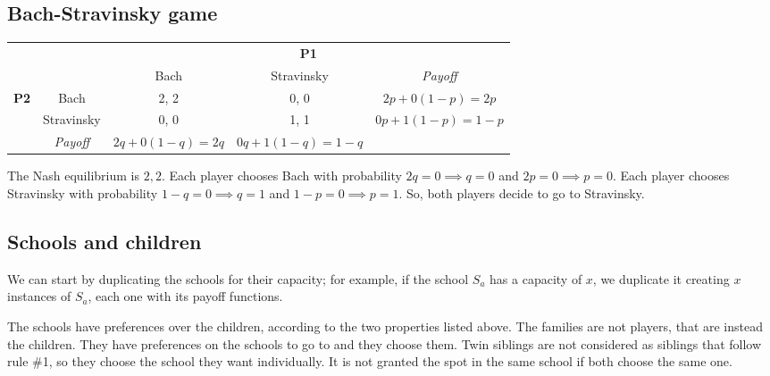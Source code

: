 \documentclass{article}
\begin{document}
\subsection{Bach-Stravinsky game}
\begin{center}
\begin{tabular}{ccccc}
                                                        &                                      & \multicolumn{3}{c}{\textbf{P1}}                                                                             \\ \cline{3-5} 
                                                        & \multicolumn{1}{c|}{}                & \multicolumn{1}{c|}{Bach}           & \multicolumn{1}{c|}{Stravinsky}      & \multicolumn{1}{c|}{\textit{Payoff}} \\ \cline{2-5} 
\multicolumn{1}{c|}{\multirow{3}{*}{\textbf{P2}}} & \multicolumn{1}{c|}{Bach}            & \multicolumn{1}{c|}{2, 2}           & \multicolumn{1}{c|}{0, 0}            & \multicolumn{1}{c|}{$2p+0(1-p)=2p$}  \\ \cline{2-5} 
\multicolumn{1}{c|}{}                                   & \multicolumn{1}{c|}{Stravinsky}      & \multicolumn{1}{c|}{0, 0}           & \multicolumn{1}{c|}{1, 1}            & \multicolumn{1}{c|}{$0p+1(1-p)=1-p$} \\ \cline{2-5} 
\multicolumn{1}{c|}{}                                   & \multicolumn{1}{c|}{\textit{Payoff}} & \multicolumn{1}{c|}{$2q+0(1-q)=2q$} & \multicolumn{1}{c|}{$0q+1(1-q)=1-q$} & \multicolumn{1}{c|}{}                \\ \cline{2-5} 
\end{tabular}
\end{center}
The Nash equilibrium is $2,2$.
Each player chooses Bach with probability $2q=0 \implies q=0$ and $2p=0 \implies p=0$.
Each player chooses Stravinsky with probability $1-q=0 \implies q=1$ and $1-p=0 \implies p=1$.
So, both players decide to go to Stravinsky.

\subsection{Schools and children}
We can start by duplicating the schools for their capacity; for example, if the school $S_a$ has a capacity of $x$, we duplicate it creating $x$ instances of $S_a$, each one with its payoff functions.

The schools have preferences over the children, according to the two properties listed above.
The families are not players, that are instead the children. They have preferences on the schools to go to and they choose them.
Twin siblings are not considered as siblings that follow rule \#1, so they choose the school they want individually. It is not granted the spot in the same school if both choose the same one.
\end{document}
